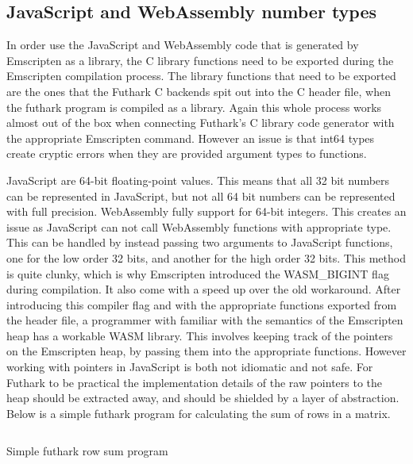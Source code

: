 \documentclass[11pt]{book}
\begin{document}
\subsection{JavaScript and WebAssembly number types}

In order use the JavaScript and WebAssembly code that is generated by Emscripten as a library, the C library functions need to be exported during the Emscripten compilation process. The library functions that need to be exported are the ones that the Futhark C backends spit out into the C header file, when the futhark program is compiled as a library. Again this whole process works almost out of the box when connecting Futhark's C library code generator with the appropriate Emscripten command. However an issue is that int64 types create cryptic errors when they are provided argument types to functions. 

JavaScript are 64-bit floating-point values. This means that all 32 bit numbers can be represented in JavaScript, but not all 64 bit numbers can be represented with full precision. WebAssembly fully support for 64-bit integers. This creates an issue as JavaScript can not call WebAssembly functions with appropriate type. This can be handled by instead passing two arguments to JavaScript functions, one for the low order 32 bits, and another for the high order 32 bits. This method is quite clunky, which is why Emscripten introduced the WASM\_BIGINT flag during compilation. It also come with a speed up over the old workaround. 
After introducing this compiler flag and with the appropriate functions exported from the header file,  %
a programmer with familiar with the semantics of the Emscripten heap has a workable WASM library. This involves keeping track of the pointers on the Emscripten heap, by passing them into the appropriate functions. However working with pointers in JavaScript is both not idiomatic and not safe. For Futhark to be practical the implementation details of the raw pointers to the heap should be extracted away, and should be shielded by a layer of abstraction.
Below is a simple futhark program for calculating the sum of rows in a matrix. 

\begin{listing}[H] 
        \inputminted[fontsize=\small,baselinestretch=0.5,linenos]{haskell}{code/compiler/c-backend/main.fut}
        \caption{Simple futhark row sum program}
        \label{lst:futhark-capi}   

\end{listing} 
\end{document}
